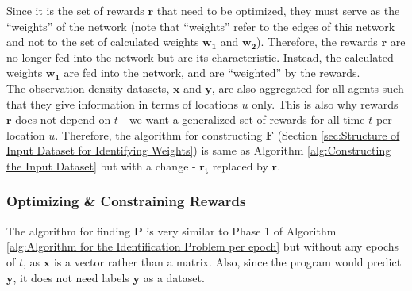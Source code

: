\documentclass[12pt]{article}
\newcommand{\vect}[1]{\mathbf{#1}}  %
\newcommand{\matr}[1]{\mathbf{#1}}  %
\begin{document}
    Since it is the set of rewards $\vect{r}$ that need to be optimized, they must serve as the ``weights'' of the network (note that ``weights'' refer to the edges of this network and not to the set of calculated weights $\matr{w_1}$ and $\matr{w_2}$). Therefore, the rewards $\vect{r}$ are no longer fed into the network but are its characteristic. Instead, the calculated weights $\matr{w_1}$ are fed into the network, and are ``weighted'' by the rewards.\\
    
    The observation density datasets, $\matr{x}$ and $\matr{y}$, are also aggregated for all agents such that they give information in terms of locations $u$ only. This is also why rewards $\vect{r}$ does not depend on $t$ - we want a generalized set of rewards for all time $t$ per location $u$. Therefore, the algorithm for constructing $\matr{F}$ (Section \ref{sec:Structure of Input Dataset for Identifying Weights}) is same as Algorithm \ref{alg:Constructing the Input Dataset} but with a change - $\vect{r_t}$ replaced by $\vect{r}$.
    
    \subsubsection{Optimizing \& Constraining Rewards} \label{sec:Optimizing and Constraining Rewards}
    The algorithm for finding $\matr{P}$ is very similar to Phase 1 of Algorithm \ref{alg:Algorithm for the Identification Problem per epoch} but without any epochs of $t$, as $\vect{x}$ is a vector rather than a matrix. Also, since the program would predict $\vect{y}$, it does not need labels $\vect{y}$ as a dataset.\\
    
\end{document}
